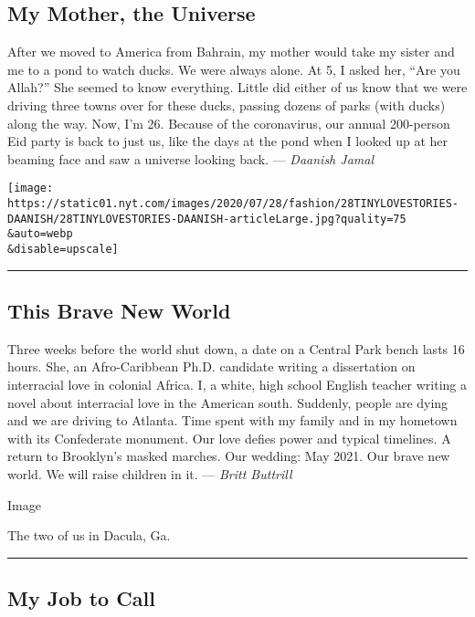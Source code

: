 \hypertarget{my-mother-the-universe}{%
\subsection{My Mother, the Universe}\label{my-mother-the-universe}}

After we moved to America from Bahrain, my mother would take my sister
and me to a pond to watch ducks. We were always alone. At 5, I asked
her, ``Are you Allah?'' She seemed to know everything. Little did either
of us know that we were driving three towns over for these ducks,
passing dozens of parks (with ducks) along the way. Now, I'm 26. Because
of the coronavirus, our annual 200-person Eid party is back to just us,
like the days at the pond when I looked up at her beaming face and saw a
universe looking back. --- \emph{Daanish Jamal}

\texttt{[image: https://static01.nyt.com/images/2020/07/28/fashion/28TINYLOVESTORIES-DAANISH/28TINYLOVESTORIES-DAANISH-articleLarge.jpg?quality=75\\\&auto=webp\\\&disable=upscale]}

\begin{center}\rule{0.5\linewidth}{\linethickness}\end{center}

\hypertarget{this-brave-new-world}{%
\subsection{This Brave New World}\label{this-brave-new-world}}

Three weeks before the world shut down, a date on a Central Park bench
lasts 16 hours. She, an Afro-Caribbean Ph.D. candidate writing a
dissertation on interracial love in colonial Africa. I, a white, high
school English teacher writing a novel about interracial love in the
American south. Suddenly, people are dying and we are driving to
Atlanta. Time spent with my family and in my hometown with its
Confederate monument. Our love defies power and typical timelines. A
return to Brooklyn's masked marches. Our wedding: May 2021. Our brave
new world. We will raise children in it. --- \emph{Britt Buttrill}

Image

The two of us in Dacula, Ga.

\begin{center}\rule{0.5\linewidth}{\linethickness}\end{center}

\hypertarget{my-job-to-call}{%
\subsection{My Job to Call}\label{my-job-to-call}}

